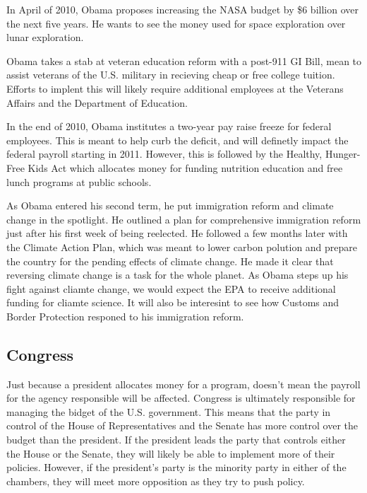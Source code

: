 \documentclass{article}
\begin{document}
        \par
        In April of 2010, Obama proposes increasing the NASA budget by \$6 billion over the next five years. He wants to see the money used for space exploration over lunar exploration.\cite{obamaevents}
        \par
        Obama takes a stab at veteran education reform with a post-911 GI Bill, mean to assist veterans of the U.S. military in recieving cheap or free college tuition.\cite{obamaevents} Efforts to implent this will likely require additional employees at the Veterans Affairs and the Department of Education.
        \par
        In the end of 2010, Obama institutes a two-year pay raise freeze for federal employees. This is meant to help curb the deficit, and will definetly impact the federal payroll starting in 2011. However, this is followed by the Healthy, Hunger-Free Kids Act which allocates money for funding nutrition education and free lunch programs at public schools.
        \par
        As Obama entered his second term, he put immigration reform and climate change in the spotlight. He outlined a plan for comprehensive immigration reform just after his first week of being reelected. He followed a few months later with the Climate Action Plan, which was meant to lower carbon polution and prepare the country for the pending effects of climate change. He made it clear that reversing climate change is a task for the whole planet.\cite{obamaevents} As Obama steps up his fight against cliamte change, we would expect the EPA to receive additional funding for cliamte science. It will also be interesint to see how Customs and Border Protection responed to his immigration reform.

    \subsection{Congress}
    Just because a president allocates money for a program, doesn't mean the payroll for the agency responsible will be affected. Congress is ultimately responsible for managing the bidget of the U.S. government. This means that the party in control of the House of Representatives and the Senate has more control over the budget than the president. If the president leads the party that controls either the House or the Senate, they will likely be able to implement more of their policies. However, if the president's party is the minority party in either of the chambers, they will meet more opposition as they try to push policy.
\end{document}
